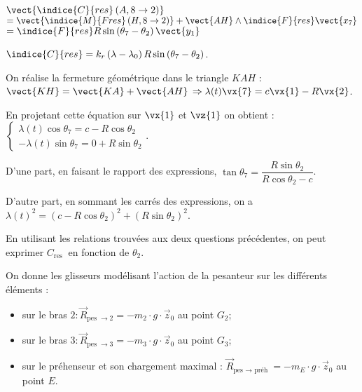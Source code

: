 \ifprof
\begin{corrige}

$\vect{\indice{C}{res}\left(A,8 \rightarrow 2 \right)}$
$= \vect{\indice{M}{Fres}\left(H,8 \rightarrow 2 \right)} + \vect{AH} \wedge \indice{F}{res} \vect{x_7}$
$= \indice{F}{res} R \sin\left(\theta_7 - \theta_2\right) \vect{y_1}$

$\indice{C}{res} = k_r \left(\lambda - \lambda_0\right) R \sin \left(\theta_7 - \theta_2\right) $.

\end{corrige}
\else
\fi

\ifprof
\begin{corrige}

On réalise la fermeture géométrique dans le triangle $KAH$ :
	$\vect{KH} = \vect{KA} + \vect{AH}$ $\Rightarrow \lambda(t) \vx{7} = c\vx{1} - R\vx{2}$.

En projetant cette équation sur  $\vx{1}$ et $\vz{1}$ on obtient :
$\left\{
\begin{array}{l}
\lambda(t) \cos\theta_7 = c - R \cos \theta_2 \\
-\lambda(t) \sin\theta_7 = 0 + R \sin \theta_2
\end{array}
\right.
$.

D'une part, en faisant le rapport des expressions, $\tan\theta_7 = \dfrac{R \sin \theta_2}{R \cos \theta_2-c}$.

D'autre part, en sommant les carrés des expressions, on a $\lambda(t)^2 = \left( c - R \cos \theta_2\right)^2 + \left( R \sin \theta_2\right)^2$.

\end{corrige}
\else
\fi

\ifprof
\else

En utilisant les relations trouvées aux deux questions précédentes, on peut exprimer $C_{\text {res }}$ en fonction de $\theta_{2}$.

On donne les glisseurs modélisant l'action de la pesanteur sur les différents éléments :
\begin{itemize}
  \item sur le bras $2: \vec{R}_{\text {pes } \rightarrow 2}=-m_{2} \cdot g \cdot \vec{z}_{0}$ au point $G_{2}$;
  \item sur le bras $3: \vec{R}_{\text {pes } \rightarrow 3}=-m_{3} \cdot g \cdot \vec{z}_{0}$ au point $G_{3}$;
  \item sur le préhenseur et son chargement maximal : $\vec{R}_{\text {pes } \rightarrow \text { préh }}=-m_{E} \cdot g \cdot \vec{z}_{0}$ au point $E$.
\end{itemize}

